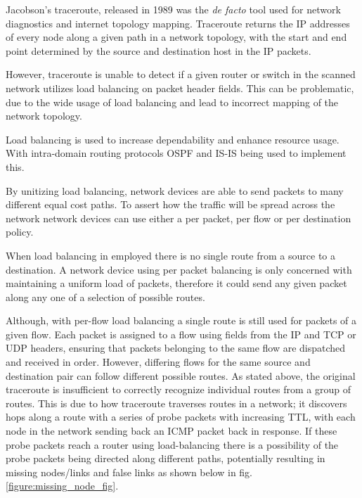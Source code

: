 Jacobson's traceroute, released in 1989 was the \textit{de facto} tool used for network diagnostics and internet topology mapping.
Traceroute returns the IP addresses of every node along a given path in a network topology, with the start and end point determined by the source and destination host in the IP packets.\cite{jacobson1989traceroute}

However, traceroute is unable to detect if a given router or switch in the scanned network utilizes load balancing on packet header fields. This can be problematic, due to the wide usage of load balancing and lead to incorrect mapping of the network topology.\cite{anomalies}\cite{exhaustive}

Load balancing is used to increase dependability and enhance resource usage. With intra-domain routing protocols OSPF\cite{moyospf} and IS-IS\cite{isis} being used to implement this. 

By unitizing load balancing, network devices are able to send packets to many different equal cost paths. To assert how the traffic will be spread across the network network devices can use either a per packet, per flow or per destination policy. \cite{cisco}\cite{juniper} 

When load balancing in employed there is no single route from a source to a destination. A network device using per packet balancing is only concerned with maintaining a uniform load of packets, therefore it could send any given packet along any one of a selection of possible routes.\cite{anomalies}

Although, with per-flow load balancing a single route is still used for packets of a given flow. Each packet is assigned to a flow using fields from the IP and TCP or UDP headers, ensuring that packets belonging to the same flow are dispatched and received in order. However, differing flows for the same source and destination pair can follow different possible routes.\cite{anomalies} 
As stated above, the original traceroute is insufficient to correctly recognize individual routes from a group of routes. This is due to how traceroute traverses routes in a network; it discovers hops along a route with a series of probe packets with increasing TTL, with each node in the network sending back an ICMP packet back in response. If these probe packets reach a router using load-balancing there is a possibility of the probe packets being directed along different paths, potentially resulting in missing nodes/links and false links as shown below in fig. \ref{figure:missing_node_fig}.

